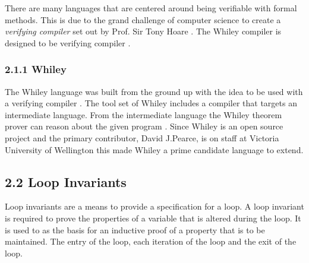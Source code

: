 \documentclass[11pt, a4paper, twoside, openright]{report}
\begin{document}
There are many languages that are centered around being verifiable
with formal methods.
This is due to the grand challenge of computer science
to create a \textit{verifying compiler} set out by Prof. Sir Tony Hoare \cite{Hoare-grand}.
The Whiley compiler is designed to be verifying compiler \cite{whiley-origin}.

\subsubsection*{2.1.1 Whiley}

The Whiley language was built from the ground up with the idea to be used with
a verifying compiler \cite{whiley-origin}.
The tool set of Whiley includes a compiler that targets an intermediate
language. From the intermediate language the Whiley theorem prover can reason
about the given program \cite{whiley-design} \cite{whiley-origin}.
Since Whiley is an open source project and the primary contributor, David
J.Pearce, is on staff at Victoria University of Wellington this made Whiley a
prime candidate language to extend.








\subsection*{2.2 Loop Invariants}
%

Loop invariants are a means to provide a specification for a loop.
A loop invariant is required to prove the properties of a variable
that is altered during the loop.
It is used to as the basis for an inductive proof of a
property that is to be maintained.
The entry of the loop, each iteration of the loop and the exit of the
loop.
\end{document}
